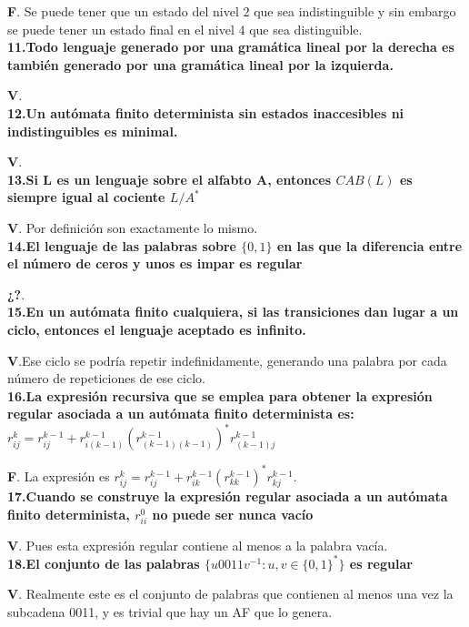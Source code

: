 \documentclass[a4paper,11pt]{article}
\begin{document}
\textbf{F}. Se puede tener que un estado del nivel 2 que sea indistinguible y sin embargo se puede tener un estado final en el nivel 4 que sea distinguible. \\

\textbf{11.Todo lenguaje generado por una gramática lineal por la derecha es también generado por una gramática lineal por la izquierda.}

\textbf{V}. \\

\textbf{12.Un autómata finito determinista sin estados inaccesibles ni indistinguibles es minimal.}

\textbf{V}. \\

\textbf{13.Si L es un lenguaje sobre el alfabto A, entonces $CAB(L)$ es siempre igual al cociente $L/A^*$}

\textbf{V}. Por definición son exactamente lo mismo. \\

\textbf{14.El lenguaje de las palabras sobre $\{0,1\}$ en las que la diferencia entre el número de ceros y unos es impar es regular}

\textbf{¿?}. \\

\textbf{15.En un autómata finito cualquiera, si las transiciones dan lugar a un ciclo, entonces el lenguaje aceptado es infinito.}

\textbf{V}.Ese ciclo se podría repetir indefinidamente, generando una palabra por cada número de repeticiones de ese ciclo. \\

\textbf{16.La expresión recursiva que se emplea para obtener la expresión regular asociada a un autómata finito determinista es: $r_{ij}^k=r_{ij}^{k-1}+r_{i(k-1)}^{k-1}(r_{(k-1)(k-1)}^{k-1})^*r_{(k-1)j}^{k-1}$}

\textbf{F}. La expresión es $r_{ij}^k=r_{ij}^{k-1}+r_{ik}^{k-1}(r_{kk}^{k-1})^*r_{kj}^{k-1}$. \\

\textbf{17.Cuando se construye la expresión regular asociada a un autómata finito determinista, $r_{ii}^0$ no puede ser nunca vacío}

\textbf{V}. Pues esta expresión regular contiene al menos a la palabra vacía. \\

\textbf{18.El conjunto de las palabras $\{u0011v^{-1}:u,v\in \{0,1\}^*\}$ es regular}

\textbf{V}. Realmente este es el conjunto de palabras que contienen al menos una vez la subcadena 0011, y es trivial que hay un AF que lo genera. \\
\end{document}
